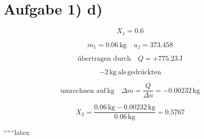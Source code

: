\section*{Aufgabe 1) d)}

\[
X_1 = 0.6
\]

\[
m_1 = 0.06 \, \text{kg} \quad u_f = 373.458
\]

\[
\text{übertragen durch} \quad Q = +775.23 \, \text{J}
\]

\[
-2 \, \text{kg} \, \text{als} \, \text{gedrückten}
\]

\[
\text{umrechnen auf} \, \text{kg} \quad \Delta m = \frac{Q}{\Delta u} = -0.00232 \, \text{kg}
\]

\[
X_2 = \frac{0.06 \, \text{kg} - 0.00232 \, \text{kg}}{0.06 \, \text{kg}} = \underline{0.5767}
\]

``````latex